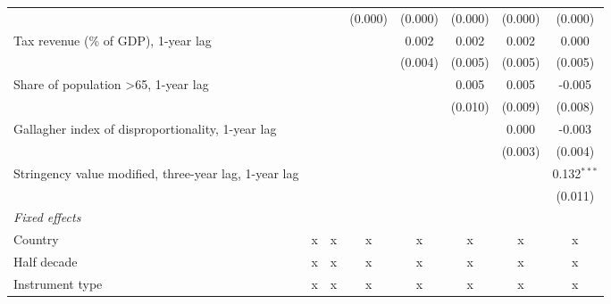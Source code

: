 \begin{tabular}{lccccccc}
                                                                             &              &              & (0.000)      & (0.000)      & (0.000)      & (0.000)      & (0.000)\\   
   Tax revenue (\% of GDP), 1-year lag                                       &              &              &              & 0.002        & 0.002        & 0.002        & 0.000\\   
                                                                             &              &              &              & (0.004)      & (0.005)      & (0.005)      & (0.005)\\   
   Share of population >65, 1-year lag                                       &              &              &              &              & 0.005        & 0.005        & -0.005\\   
                                                                             &              &              &              &              & (0.010)      & (0.009)      & (0.008)\\   
   Gallagher index of disproportionality, 1-year lag                         &              &              &              &              &              & 0.000        & -0.003\\   
                                                                             &              &              &              &              &              & (0.003)      & (0.004)\\   
   Stringency value modified, three-year lag, 1-year lag                     &              &              &              &              &              &              & 0.132$^{***}$\\   
                                                                             &              &              &              &              &              &              & (0.011)\\   
   \emph{Fixed effects}\\
   Country                                                                   & x            & x            & x            & x            & x            & x            & x\\  
   Half decade                                                               & x            & x            & x            & x            & x            & x            & x\\  
   Instrument type                                                           & x            & x            & x            & x            & x            & x            & x\\  

\end{tabular}
